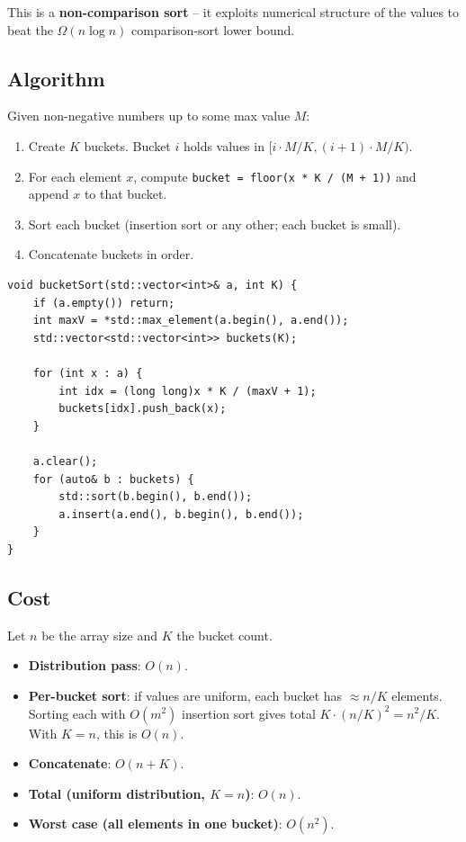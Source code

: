 \documentclass[11pt]{article}
\begin{document}
This is a \textbf{non-comparison sort} -- it exploits numerical structure of the values to beat the $\Omega(n \log n)$ comparison-sort lower bound.

\subsection*{Algorithm}

Given non-negative numbers up to some max value $M$:

\begin{enumerate}[leftmargin=*]
    \item Create $K$ buckets. Bucket $i$ holds values in $[i \cdot M/K, (i+1) \cdot M/K)$.
    \item For each element $x$, compute \texttt{bucket = floor(x * K / (M + 1))} and append $x$ to that bucket.
    \item Sort each bucket (insertion sort or any other; each bucket is small).
    \item Concatenate buckets in order.
\end{enumerate}

\begin{lstlisting}[basicstyle=\ttfamily\small,frame=single]
void bucketSort(std::vector<int>& a, int K) {
    if (a.empty()) return;
    int maxV = *std::max_element(a.begin(), a.end());
    std::vector<std::vector<int>> buckets(K);

    for (int x : a) {
        int idx = (long long)x * K / (maxV + 1);
        buckets[idx].push_back(x);
    }

    a.clear();
    for (auto& b : buckets) {
        std::sort(b.begin(), b.end());
        a.insert(a.end(), b.begin(), b.end());
    }
}
\end{lstlisting}

\subsection*{Cost}

Let $n$ be the array size and $K$ the bucket count.
\begin{itemize}[leftmargin=*]
    \item \textbf{Distribution pass}: $O(n)$.
    \item \textbf{Per-bucket sort}: if values are uniform, each bucket has $\approx n/K$ elements. Sorting each with $O(m^2)$ insertion sort gives total $K \cdot (n/K)^2 = n^2/K$. With $K = n$, this is $O(n)$.
    \item \textbf{Concatenate}: $O(n + K)$.
    \item \textbf{Total (uniform distribution, $K = n$)}: $O(n)$.
    \item \textbf{Worst case (all elements in one bucket)}: $O(n^2)$.
\end{itemize}
\end{document}
